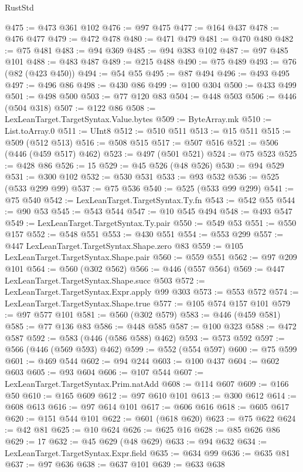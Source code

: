 \begin{lexlean}{RustStd}
\begin{coremodule}
@475 := @473 @361 @102
@476 := @97 @475
@477 := @164 @437
@478 := @476 @477
@479 := @472 @478
@480 := @471 @479
@481 := @470 @480
@482 := @75 @481
@483 := @94 @369
@485 := @94 @383 @102
@487 := @97 @485 @101
@488 := @483 @487
@489 := @215 @488
@490 := @75 @489
@493 := @76 (@82 (@423 @450))
@494 := @54 @55
@495 := @87 @494
@496 := @493 @495
@497 := @496 @86
@498 := @430 @86
@499 := @100 @304
@500 := @433 @499
@501 := @498 @500
@503 := @77 @120 @83
@504 := @448 @503
@506 := @446 (@504 @318)
@507 := @122 @86
@508 := LexLeanTarget.TargetSyntax.Value.bytes
@509 := ByteArray.mk
@510 := List.toArray.{0}
@511 := UInt8
@512 := @510 @511
@513 := @15 @511
@515 := @509 (@512 @513)
@516 := @508 @515
@517 := @507 @516
@521 := @506 (@446 (@459 @517) @462)
@523 := @497 (@501 @521)
@524 := @75 @523
@525 := @428 @86
@526 := 15
@529 := @45 @526 (@48 @526)
@530 := @94 @529
@531 := @300 @102
@532 := @530 @531
@533 := @93 @532
@536 := @525 (@533 @299 @99)
@537 := @75 @536
@540 := @525 (@533 @99 @299)
@541 := @75 @540
@542 := LexLeanTarget.TargetSyntax.Ty.fn
@543 := @542 @55
@544 := @90 @53
@545 := @543 @544
@547 := @10 @545 @494
@548 := @493 @547
@549 := LexLeanTarget.TargetSyntax.Ty.pair
@550 := @549 @53
@551 := @550 @157
@552 := @548 @551
@553 := @430 @551
@554 := @553 @299
@557 := @447 LexLeanTarget.TargetSyntax.Shape.zero @83
@559 := @105 LexLeanTarget.TargetSyntax.Shape.pair
@560 := @559 @551
@562 := @97 @209 @101
@564 := @560 (@302 @562)
@566 := @446 (@557 @564)
@569 := @447 LexLeanTarget.TargetSyntax.Shape.succ @503
@572 := LexLeanTarget.TargetSyntax.Expr.apply @99 @303
@573 := @553 @572
@574 := LexLeanTarget.TargetSyntax.Shape.true
@577 := @105 @574 @157 @101
@579 := @97 @577 @101
@581 := @560 (@302 @579)
@583 := @446 (@459 @581)
@585 := @77 @136 @83
@586 := @448 @585
@587 := @100 @323
@588 := @472 @587
@592 := @583 (@446 (@586 @588) @462)
@593 := @573 @592
@597 := @566 (@446 (@569 @593) @462)
@599 := @552 (@554 @597)
@600 := @75 @599
@601 := @469 @544
@602 := @94 @244
@603 := @100 @437
@604 := @602 @603
@605 := @93 @604
@606 := @107 @544
@607 := LexLeanTarget.TargetSyntax.Prim.natAdd
@608 := @114 @607
@609 := @166 @50
@610 := @165 @609
@612 := @97 @610 @101
@613 := @300 @612
@614 := @608 @613
@616 := @97 @614 @101
@617 := @606 @616
@618 := @605 @617
@620 := @151 @544 @101
@622 := @601 (@618 @620)
@623 := @75 @622
@624 := @42 @81
@625 := @10 @624
@626 := @625 @16
@628 := @85 @626 @86
@629 := 17
@632 := @45 @629 (@48 @629)
@633 := @94 @632
@634 := LexLeanTarget.TargetSyntax.Expr.field
@635 := @634 @99
@636 := @635 @81
@637 := @97 @636
@638 := @637 @101
@639 := @633 @638

\end{coremodule}
\end{lexlean}
